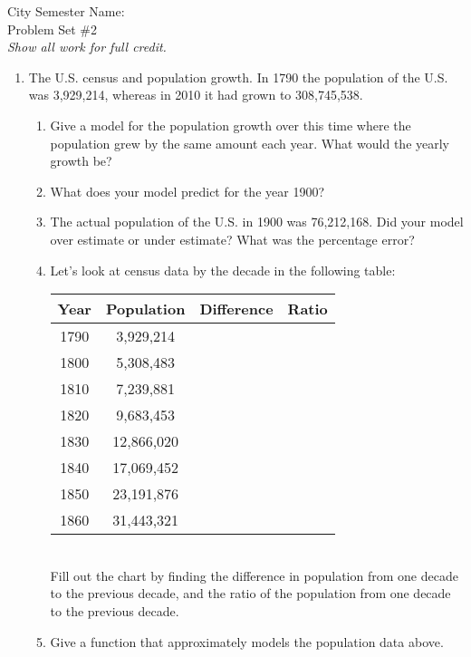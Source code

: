 \documentclass[12pt]{article}
\theoremstyle{plain}     %
\begin{document}
\large
City Semester  \hspace{8cm} Name:\makebox[6cm]{\hrulefill}
\\
Problem Set \#2\\
\normalsize 
\emph{Show all work for full credit.}\\
\begin{enumerate}
	\item The U.S. census and population growth. In 1790 the population of the U.S. was 3,929,214, whereas in 2010 it had grown to 308,745,538.
	
		\begin{enumerate}
			\item Give a model for the population growth over this time where the population grew by the same amount each year. What would the yearly growth be?\\
			\item What does your model predict for the year 1900?\\
			\item The actual population of the U.S. in 1900 was 76,212,168. Did your model over estimate or under estimate? What was the percentage error?\\
			\item Let's look at census data by the decade in the  following table:\\
			\begin{tabular}{c | c | c |c}
				Year & Population & Difference & Ratio\\
				\hline
				1790 & 3,929,214 & &\\
				1800 & 5,308,483 & &\\
				1810 & 7,239,881 & &\\
				1820 & 9,683,453 & &\\
				1830 & 12,866,020 & &\\
				1840 & 17,069,452 & &\\
				1850 & 23,191,876 & &\\
				1860 & 31,443,321 & &\\
			\end{tabular}\\[.5cm]
			Fill out the chart by finding the difference in population from one decade to the previous decade, and the ratio of the population from one decade to the previous decade.
			\item Give a function that approximately models the population data above.\\[1cm]
			

\end{enumerate}
\end{enumerate}
\end{document}
